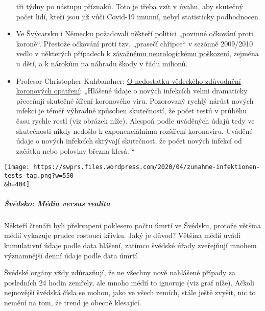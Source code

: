 \begin{itemize}
  tři týdny po nástupu příznaků. Toto je třeba vzít v úvahu, aby
  skutečný počet lidí, kteří jsou již vůči Covid-19 imunní, nebyl
  statisticky podhodnocen.
\item
  Ve
  \href{https://www.20min.ch/schweiz/news/story/-rzte-und-Politiker-fordern-Corona-Impfzwang-20853917}{Švýcarsku}
  i
  \href{https://www.faz.net/agenturmeldungen/dpa/soeder-waere-fuer-deutschlandweite-impfpflicht-gegen-corona-16738369.html}{Německu}
  požadovali někteří politici „povinné očkování proti koroně``. Přestože
  očkování proti tzv. „prasečí chřipce`` v sezónně 2009/2010 vedlo v
  některých případech k
  \href{https://www.ibtimes.co.uk/brain-damaged-uk-victims-swine-flu-vaccine-get-60-million-compensation-1438572}{závažnému
  neurologickému poškození}, zejména u dětí, a k nárokům na náhradu
  škody v řádu milionů.
\item
  Profesor Christopher Kuhbandner:
  \href{https://www.heise.de/tp/features/Von-der-fehlenden-wissenschaftlichen-Begruendung-der-Corona-Massnahmen-4709563.html?seite=all}{O
  nedostatku vědeckého zdůvodnění koronových opatření}: „Hlášené údaje o
  nových infekcích velmi dramaticky přeceňují skutečné šíření koronového
  viru. Pozorovaný rychlý nárůst nových infekcí je téměř výhradně
  způsoben skutečností, že počet testů v průběhu času rychle rostl (viz
  obrázek níže). Alespoň podle uváděných údajů tedy ve skutečnosti nikdy
  nedošlo k exponenciálnímu rozšíření koronaviru. Uváděné údaje o nových
  infekcích skrývají skutečnost, že počet nových infekcí od začátku nebo
  poloviny března klesá. ``
\end{itemize}

\texttt{[image: https://swprs.files.wordpress.com/2020/04/zunahme-infektionen-tests-tag.png?w=550\\\&h=404]}

\hypertarget{ux161vuxe9dsko-muxe9dia-versus-realita}{%
\subparagraph{\texorpdfstring{\textbf{Švédsko: Média versus
realita}}{Švédsko: Média versus realita}}\label{ux161vuxe9dsko-muxe9dia-versus-realita}}

Někteří čtenáři byli překvapeni poklesem počtu úmrtí ve Švédsku, protože
většina médií vykazuje prudce rostoucí křivku. Jaký je důvod? Většina
médií uvádí kumulativní údaje podle data hlášení, zatímco švédské úřady
zveřejňují mnohem významnější denní údaje podle data úmrtí.

 Švédské orgány vždy zdůrazňují, že ne všechny nově nahlášené případy za
posledních 24 hodin zemřely, ale mnoho médií to ignoruje (viz graf
níže). Ačkoli nejnovější švédská čísla se mohou, jako ve všech zemích,
stále ještě zvyšit, nic to nemění na tom, že trend je obecně klesající.

